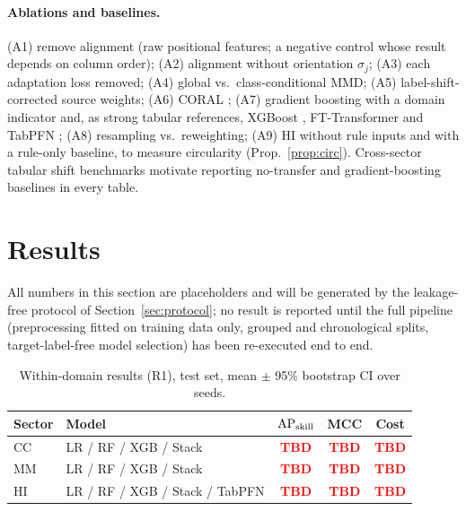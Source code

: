 \documentclass[journal]{IEEEtran}
\newcommand{\TBD}{\textcolor{red}{\textbf{TBD}}}
\newcommand{\1}{\mathbf{1}}
\begin{document}
\paragraph{Ablations and baselines.} (A1) remove alignment (raw positional features; a negative control whose result depends on column order); (A2) alignment without orientation $\sigma_j$; (A3) each adaptation loss removed; (A4) global vs.\ class-conditional MMD; (A5) label-shift-corrected source weights; (A6) CORAL \cite{sun2016coral}; (A7) gradient boosting with a domain indicator and, as strong tabular references, XGBoost \cite{chen2016xgboost}, FT-Transformer \cite{gorishniy2021revisiting} and TabPFN \cite{hollmann2025tabpfn}; (A8) resampling vs.\ reweighting; (A9) HI without rule inputs and with a rule-only baseline, to measure circularity (Prop.~\ref{prop:circ}). Cross-sector tabular shift benchmarks \cite{gardner2023tableshift} motivate reporting no-transfer and gradient-boosting baselines in every table.

\section{Results}\label{sec:results}
All numbers in this section are placeholders and will be generated by the leakage-free protocol of Section~\ref{sec:protocol}; no result is reported until the full pipeline (preprocessing fitted on training data only, grouped and chronological splits, target-label-free model selection) has been re-executed end to end.

\begin{table}[t]
\centering
\caption{Within-domain results (R1), test set, mean $\pm$ 95\% bootstrap CI over seeds.}
\label{tab:within}
\small
\begin{tabular}{@{}llccc@{}}
\toprule
Sector & Model & $\mathrm{AP}_{\rm skill}$ & MCC & Cost \\
\midrule
CC & LR / RF / XGB / Stack & \TBD & \TBD & \TBD \\
MM & LR / RF / XGB / Stack & \TBD & \TBD & \TBD \\
HI & LR / RF / XGB / Stack / TabPFN & \TBD & \TBD & \TBD \\
\bottomrule
\end{tabular}
\end{table}
\end{document}
